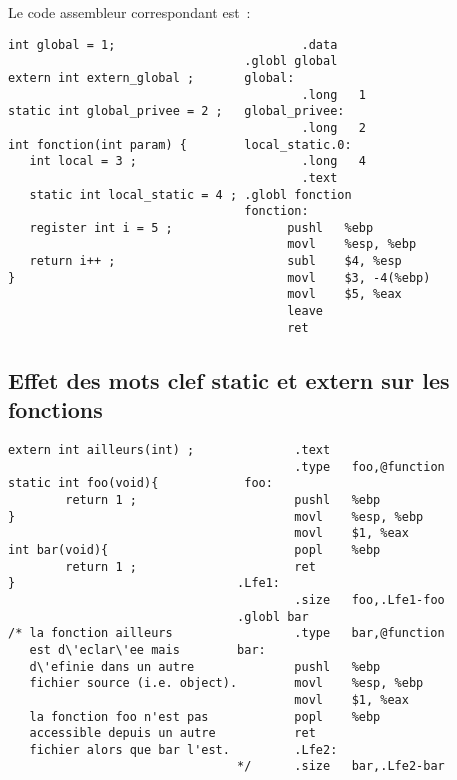 \begin{frame}[fragile]
Le code assembleur correspondant est~:
\begin{verbatim}
int global = 1;                          .data                
                                 .globl global                   
extern int extern_global ;       global:                      
                                         .long   1            
static int global_privee = 2 ;   global_privee:               
                                         .long   2            
int fonction(int param) {        local_static.0:              
   int local = 3 ;                       .long   4            
                                         .text                
   static int local_static = 4 ; .globl fonction              
                                 fonction:                    
   register int i = 5 ;                pushl   %ebp         
                                       movl    %esp, %ebp   
   return i++ ;                        subl    $4, %esp     
}                                      movl    $3, -4(%ebp) 
                                       movl    $5, %eax     
                                       leave                
                                       ret                  
\end{verbatim}
\end{frame}
\begin{frame}[fragile]
  \section{Effet des mots clef static et extern sur les fonctions}%
\begin{verbatim}
extern int ailleurs(int) ;              .text                    
                                        .type   foo,@function    
static int foo(void){            foo:                             
        return 1 ;                      pushl   %ebp             
}                                       movl    %esp, %ebp       
                                        movl    $1, %eax         
int bar(void){                          popl    %ebp             
        return 1 ;                      ret                      
}                               .Lfe1:                           
                                        .size   foo,.Lfe1-foo    
                                .globl bar                       
/* la fonction ailleurs                 .type   bar,@function    
   est d\'eclar\'ee mais        bar:                             
   d\'efinie dans un autre              pushl   %ebp             
   fichier source (i.e. object).        movl    %esp, %ebp       
                                        movl    $1, %eax         
   la fonction foo n'est pas            popl    %ebp             
   accessible depuis un autre           ret                      
   fichier alors que bar l'est.         .Lfe2:                           
                                */      .size   bar,.Lfe2-bar    
\end{verbatim}
\end{frame}
